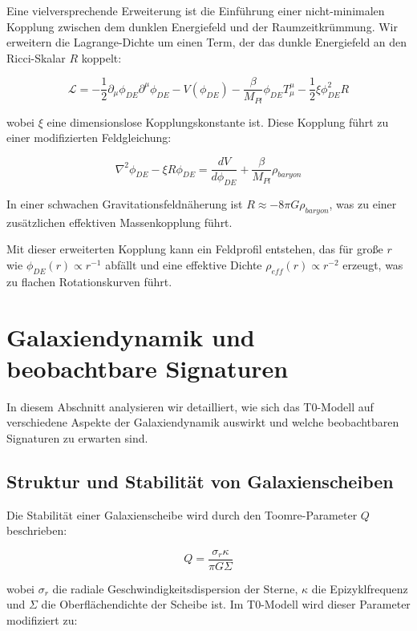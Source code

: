 \documentclass[a4paper,12pt]{article}
\begin{document}
Eine vielversprechende Erweiterung ist die Einführung einer nicht-minimalen Kopplung zwischen dem dunklen Energiefeld und der Raumzeitkrümmung. Wir erweitern die Lagrange-Dichte um einen Term, der das dunkle Energiefeld an den Ricci-Skalar $R$ koppelt:

\begin{equation}
	\mathcal{L} = -\frac{1}{2}\partial_\mu \phi_{DE} \partial^\mu \phi_{DE} - V(\phi_{DE}) - \frac{\beta}{M_{Pl}}\phi_{DE}T^{\mu}_{\mu} - \frac{1}{2}\xi \phi_{DE}^2 R
\end{equation}

wobei $\xi$ eine dimensionslose Kopplungskonstante ist. Diese Kopplung führt zu einer modifizierten Feldgleichung:

\begin{equation}
	\nabla^2 \phi_{DE} - \xi R \phi_{DE} = \frac{dV}{d\phi_{DE}} + \frac{\beta}{M_{Pl}}\rho_{baryon}
\end{equation}

In einer schwachen Gravitationsfeldnäherung ist $R \approx -8\pi G \rho_{baryon}$, was zu einer zusätzlichen effektiven Massenkopplung führt.

Mit dieser erweiterten Kopplung kann ein Feldprofil entstehen, das für große $r$ wie $\phi_{DE}(r) \propto r^{-1}$ abfällt und eine effektive Dichte $\rho_{eff}(r) \propto r^{-2}$ erzeugt, was zu flachen Rotationskurven führt.

\section{Galaxiendynamik und beobachtbare Signaturen}

In diesem Abschnitt analysieren wir detailliert, wie sich das T0-Modell auf verschiedene Aspekte der Galaxiendynamik auswirkt und welche beobachtbaren Signaturen zu erwarten sind.

\subsection{Struktur und Stabilität von Galaxienscheiben}

Die Stabilität einer Galaxienscheibe wird durch den Toomre-Parameter $Q$ beschrieben:

\begin{equation}
	Q = \frac{\sigma_r \kappa}{\pi G \Sigma}
\end{equation}

wobei $\sigma_r$ die radiale Geschwindigkeitsdispersion der Sterne, $\kappa$ die Epizyklfrequenz und $\Sigma$ die Oberflächendichte der Scheibe ist. Im T0-Modell wird dieser Parameter modifiziert zu:
\end{document}

